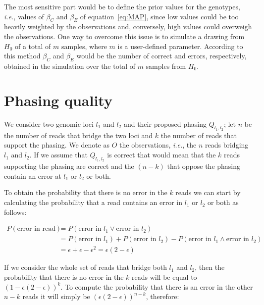 \documentclass{article}
\newcommand{\ie}{\textit{i.e.}}
\begin{document}
The most sensitive part would be to define the prior values for the
genotypes, \ie, values of $\beta_C$ and $\beta_E$ of
equation~\ref{eq:MAP}, since low values could be too heavily weighted
by the observations and, conversely, high values could overweigh the
observations.  One way to overcome this issue is to simulate a drawing
from $H_0$ of a total of $m$ samples, where $m$ is a user-defined
parameter.  According to this method $\beta_C$ and $\beta_E$ would be
the number of correct and errors, respectively, obtained in the
simulation over the total of $m$ samples from $H_0$.

\section{Phasing quality}

We consider two genomic loci $l_1$ and $l_2$ and their proposed
phasing $Q_{l_1,l_2}$; let $n$ be the number of reads that bridge the
two loci and $k$ the number of reads that support the phasing.  We
denote as $O$ the observations, \ie, the $n$ reads bridging $l_1$ and
$l_2$.  If we assume that $Q_{l_1,l_2}$ is correct that would mean
that the $k$ reads supporting the phasing are correct and the $(n-k)$
that oppose the phasing contain an error at $l_1$ or $l_2$ or both.

To obtain the probability that there is no error in the $k$ reads we
can start by calculating the probability that a read contains an error
in $l_1$ or $l_2$ or both as follows:

\begin{equation*}
  \begin{split}
    P(\mbox{error in read}) &= P(\mbox{error in }l_1  \vee \mbox{error in }l_2) \\
    &= P(\mbox{error in }l_1) + P(\mbox{error in }l_2) - P(\mbox{error in }l_1  \wedge \mbox{error in }l_2)\\
    &= \epsilon + \epsilon - \epsilon^2 = \epsilon(2-\epsilon)
  \end{split}
\end{equation*}

If we consider the whole set of reads that bridge both $l_1$ and
$l_2$, then the probability that there is no error in the $k$ reads
will be equal to $(1 - \epsilon(2-\epsilon))^k$.  To compute the
probability that there is an error in the other $n-k$ reads it will
simply be $(\epsilon(2-\epsilon))^{n-k}$, therefore:
\end{document}
